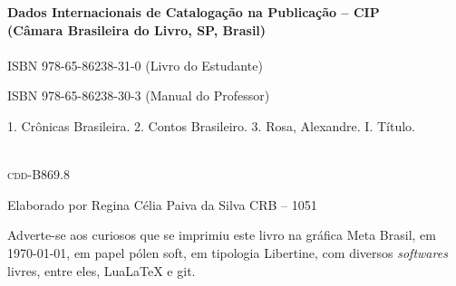 \pagebreak

\ifodd\value{page}\blankpage\fi

\parindent=0pt
\footnotesize\thispagestyle{empty}

\noindent\textbf{Dados Internacionais de Catalogação na Publicação -- CIP}\\
\noindent\textbf{(Câmara Brasileira do Livro, SP, Brasil)}\\

\dotfill\\

\hspace{20pt}ISBN 978-65-86238-31-0 (Livro do Estudante)

\hspace{20pt}ISBN 978-65-86238-30-3 (Manual do Professor)\\[6pt]

\hspace{20pt}\parbox{190pt}{1. Crônicas Brasileira. 2. Contos Brasileiro. 3. Rosa, Alexandre. I. Título.}\\[6pt]

\hspace{188pt}\textsc{cdd}-B869.8

\dotfill

\noindent{}Elaborado por Regina Célia Paiva da Silva CRB -- 1051\\
\mbox{}\vfill


\begin{center}
		\begin{minipage}{.7\textwidth}\noindent{}
		\centering\tiny
		Adverte-se aos curiosos que se imprimiu este 
		livro na gráfica Meta Brasil, 
		em \today{}, em papel pólen soft, em tipologia Libertine, 
		com diversos \emph{softwares} livres, 
		entre eles, Lua\LaTeX{} e git.\\
		\par\medskip
		\end{minipage}
\end{center}